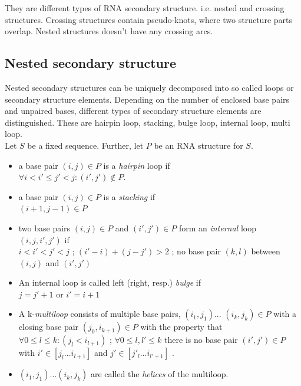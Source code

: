 \documentclass[twoside,a4paper]{report}
\numberwithin{equation}{section}
\begin{document}
	They are different types of RNA secondary structure. i.e. nested
	and crossing structures. Crossing structures contain pseudo-knots, where two structure parts overlap. Nested structures doesn't have any crossing arcs.\\
	
	\subsection{Nested secondary structure}
	Nested secondary structures can be uniquely decomposed into so called loops or secondary structure elements. Depending on the number of enclosed base pairs  and unpaired bases, different types of secondary structure elements are distinguished. These are hairpin loop, stacking, bulge loop, internal loop, multi loop. \\
	Let $S$ be a fixed sequence. Further, let $P$ be an RNA structure for $S$.
	\begin{itemize}
		\item a base pair $( i, j ) \in P$ is a \textit{hairpin} loop if\\
			$	\forall i < i' \leq j' < j : (i', j') \notin P. $

		\item a base pair $( i, j ) \in P$ is a \textit{stacking} if\\
		$(i + 1 , j - 1 ) \in P $
		\item two base pairs $ (i, j) \in P$ and $(i' ,j' ) \in P$ form  an \textit{internal} loop $(i,j,i',j')$ if \\
		$i < i' < j' < j $ ; $ (i' - i)+( j - j') > 2$ ; no base pair $(k,l)$ between $(i, j)$ and $(i',j')$
		\item An internal loop is called left (right, resp.) \textit{bulge} if\\
		$ j = j' +1 $ or $ i' = i+1$
		\item A k-\textit{multiloop} consists of multiple base pairs, $(i_1,j_1)$... $(i_k,j_k) \in P$ with a closing base pair $(j_0, i_{k+1}) \in P$ with the property that \\
		$\forall 0 \leq l \leq k : ( j_l < i_{l+1})$ ; $\forall 0 \leq l , l' \leq k$  there is no base pair $(i' ,j') \in P$ with $i' \in [j_l...i_{l+1}]$ and $j' \in [j'_l...i_{l'+1}]$ .
		\item $(i_1,j_1)...(i_k, j_k)$ are called the \textit{helices} of the multiloop.\\
 	\end{itemize}
 
\end{document}
